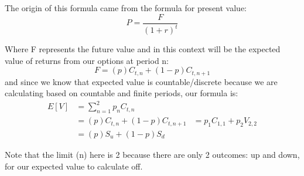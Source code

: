 \documentclass[12pt, letterpaper]{article}
\begin{document}
The origin of this formula came from the formula for present value: %
\begin{equation*}
  P = \frac{F}{(1+r)^t}
\end{equation*}

Where F represents the future value and in this context will be the expected value of returns from our options at period n:
\begin{equation*}
  F = (p)C_{t,n} + (1-p)C_{t,n+1}
\end{equation*}
and since we know that expected value is countable/discrete because we are calculating based on countable and finite periods, our formula is:
\begin{equation*}
  \begin{split}
    E[V] 
    & = \sum\limits_{n=1}^{2} p_n C_{t,n} \\
    & = (p) C_{t,n} + (1-p) C_{t,n+1}
    & = p_1 C_{1,1} + p_2 V_{2,2} \\
    & = (p) S_u + (1-p) S_d
  \end{split}
\end{equation*}

Note that the limit (n) here is 2 because there are only 2 outcomes: up and down, for our expected value to calculate off.
\end{document}
